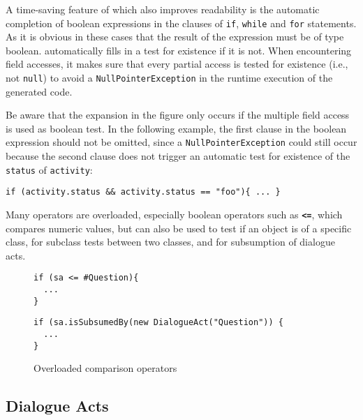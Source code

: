 A time-saving feature of \vonda which also improves readability is the
automatic completion of boolean expressions in the clauses of \texttt{if},
\texttt{while} and \texttt{for} statements. As it is obvious in these cases
that the result of the expression must be of type boolean. \vonda automatically
fills in a test for existence if it is not. When encountering field accesses,
it makes sure that every partial access is tested for existence (i.e., not
\texttt{null}) to avoid a \texttt{NullPointerException} in the runtime
execution of the generated code.

Be aware that the expansion in the figure only occurs if the multiple field
access is used as boolean test. In the following example, the first clause in
the boolean expression should not be omitted, since a
\texttt{NullPointerException} could still occur because the second clause does
not trigger an automatic test for existence of the \texttt{status} of
\texttt{activity}:

\begin{lstlisting}
if (activity.status && activity.status == "foo"){ ... }
\end{lstlisting}

Many operators are overloaded, especially boolean operators such as
\textbf{\texttt{<=}}, which compares numeric values, but can also be used to
test if an object is of a specific class, for subclass tests between two
classes, and for subsumption of dialogue acts.

\begin{figure}[htbp]
\centering
{\footnotesize%
\begin{minipage}{0.28\textwidth}
\begin{lstlisting}
if (sa <= #Question){
  ...
}
\end{lstlisting}
\end{minipage}\vline\hspace{1em}
\begin{minipage}{0.6\textwidth}
\begin{lstlisting}
if (sa.isSubsumedBy(new DialogueAct("Question")) {
  ...
}
\end{lstlisting}
\end{minipage}}\vspace*{-2ex}
\caption{\label{tab:overloaded-comparison}Overloaded comparison operators}
\end{figure}

\subsection{Dialogue Acts}
\label{sec:caret}

